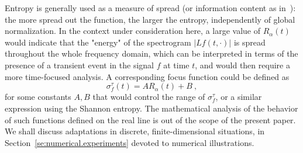 Entropy is generally used as a measure of spread (or information content as in~\cite{Baraniuk2001measuring}): the more spread out the function, the larger the entropy, independently of global normalization. In the context under consideration here, a large value of $R_\alpha(t)$ would indicate that the "energy" of the spectrogram $|Lf(t,\cdot)|$ is spread throughout the whole frequency domain, which can be interpreted in terms of the presence of a transient event in the signal $f$ at time $t$, and would then require a more time-focused analysis. A corresponding focus function could be defined as
\[
\sigma_f^\tau(t) = A R_\alpha(t) + B\ ,
\]
for some constants $A,B$ that would control the range of $\sigma_f^\tau$, or a similar expression using the Shannon entropy. The mathematical analysis of the behavior of such functions defined on the real line is out of the scope of the present paper. We shall discuss adaptations in discrete, finite-dimensional situations, in Section~\ref{se:numerical.experiments} devoted to numerical illustrations. 


